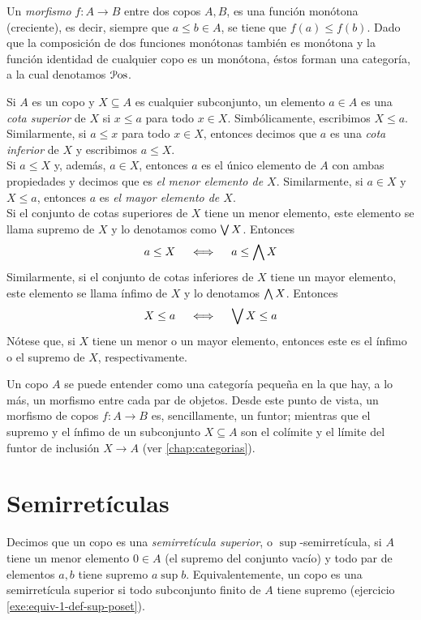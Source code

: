 Un \emph{morfismo} $f\colon A\rightarrow B$ entre dos copos $A,B$, es una función
monótona (creciente), es decir, siempre que $a\leq b\in A$, se tiene
que $f(a)\leq f(b)$.
Dado que la composición de dos funciones monótonas también es
monótona y la función identidad de cualquier copo es un monótona,
éstos forman una categoría, a la cual denotamos $\mathcal{P}\mathrm{os}$.

Si $A$ es un copo y $X\subseteq A$ es cualquier subconjunto,
un elemento $a\in A$ es una \emph{ cota superior } de $X$
si $x\leq a$ para todo $x\in X$. Simbólicamente, escribimos $X\leq a$.
Similarmente, si $a\leq x$ para todo $x\in X$, entonces decimos
que $a$ es una \emph{ cota inferior } de $X$ y escribimos $a\leq X$.
\\
Si $a\leq X$ y, además, $a\in X$, entonces $a$ es el único elemento de
$A$ con ambas propiedades y decimos que es \emph{el menor elemento de
$X$}. Similarmente, si $a\in X$ y $X\leq a$, entonces $a$ es \emph{el mayor
elemento de $X$}. \\
Si el conjunto de cotas superiores de $X$ tiene un menor
elemento, este elemento se llama supremo de $X$ y lo denotamos
como $\bigvee X$.  Entonces
\begin{equation}
  a\leq X \quad\iff\quad a\leq \bigwedge X
\end{equation}
Similarmente, si el conjunto de cotas inferiores de $X$ tiene un
mayor elemento, este elemento se llama ínfimo de $X$ y lo
denotamos $\bigwedge X$. Entonces
\begin{equation}
  X\leq a \quad\iff\quad \bigvee X\leq a
\end{equation}
Nótese que, si $X$ tiene un menor o un mayor elemento, entonces este
es el ínfimo o el supremo de $X$, respectivamente.

\begin{remark}\label{obs1}
  Un copo $A$ se puede entender como una categoría pequeña en la que
  hay, a lo más, un morfismo entre cada par de objetos.
  Desde este punto de vista, un morfismo de copos $f:A\to B$ es,
  sencillamente, un funtor; mientras que el supremo y el ínfimo de un
  subconjunto $X\subseteq A$ son el colímite y el límite del funtor
  de inclusión $X\to A$ (ver  \ref{chap:categorias}).
\end{remark}

\section{Semirretículas}
\label{ss:semirreticulas}
Decimos que un copo es una \emph{semirretícula superior},
o $\sup$-semirretícula, si $A$ tiene un menor elemento $0\in A$ (el
supremo del conjunto vacío) y todo par
de elementos $a,b$ tiene supremo $a\sup b$.
Equivalentemente, un copo es una semirretícula superior si
todo subconjunto finito de $A$ tiene supremo (ejercicio
\ref{exe:equiv-1-def-sup-poset}).

